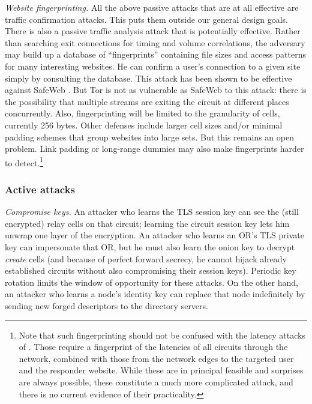 \documentclass[times,10pt,twocolumn]{article}
\begin{document}
\emph{Website fingerprinting.} All the above passive
attacks that are at all effective are traffic confirmation attacks.
This puts them outside our general design goals. There is also
a passive traffic analysis attack that is potentially effective.
Rather than searching exit connections for timing and volume
correlations, the adversary may build up a database of
``fingerprints'' containing file sizes and access patterns for many
interesting websites. He can confirm a user's connection to a given
site simply by consulting the database. This attack has
been shown to be effective against SafeWeb \cite{hintz-pet02}. But
Tor is not as vulnerable as SafeWeb to this attack: there is the
possibility that multiple streams are exiting the circuit at
different places concurrently.  Also, fingerprinting will be limited to
the granularity of cells, currently 256 bytes. Other defenses include
larger cell sizes and/or minimal padding schemes that group websites
into large sets. But this remains an open problem.  Link
padding or long-range dummies may also make fingerprints harder to
detect.\footnote{Note that
such fingerprinting should not be confused with the latency attacks
of \cite{back01}. Those require a fingerprint of the latencies of
all circuits through the network, combined with those from the
network edges to the targeted user and the responder website. While
these are in principal feasible and surprises are always possible,
these constitute a much more complicated attack, and there is no
current evidence of their practicality.}

\subsubsection*{Active attacks}

\emph{Compromise keys.} An attacker who learns the TLS session key can see
the (still encrypted) relay cells on that circuit; learning the circuit
session key lets him unwrap one layer of the encryption. An attacker
who learns an OR's TLS private key can impersonate that OR, but he must
also learn the onion key to decrypt \emph{create} cells (and because of
perfect forward secrecy, he cannot hijack already established circuits
without also compromising their session keys). Periodic key rotation
limits the window of opportunity for these attacks. On the other hand,
an attacker who learns a node's identity key can replace that node
indefinitely by sending new forged descriptors to the directory servers.
\end{document}
